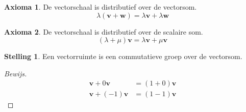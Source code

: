 \documentclass{amsart}
\theoremstyle{definition}
\newtheorem{axm}{Axioma}[section]
\newtheorem{thm}{Stelling}[section]
\newenvironment{bewijs}{\begin{proof}[Bewijs]}{\end{proof}}
\newcommand{\vvec}[1][v]{\mathbf{#1}}
\begin{document}
\begin{axm}
	De vectorschaal is distributief over de vectorsom.
	\begin{equation*}
		\lambda(\vvec + \vvec[w]) = \lambda \vvec + \lambda \vvec[w]
	\end{equation*}
\end{axm}

\begin{axm}
	De vectorschaal is distributief over de scalaire som.
	\begin{equation*}
		(\lambda + \mu)\vvec = \lambda \vvec + \mu \vvec
	\end{equation*}
\end{axm}

\begin{thm}
	Een vectorruimte is een commutatieve groep over de vectorsom.
	\begin{bewijs}
		\begin{align*}
			\vvec + 0\vvec    & = (1+0)\vvec \\
			\vvec + (-1)\vvec & = (1-1)\vvec
		\end{align*}
	\end{bewijs}
\end{thm}
\end{document}
